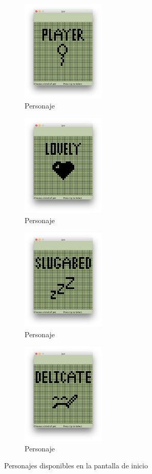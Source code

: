 \documentclass[12pt]{amsart}
\begin{document}
\begin{figure}
	\begin{subfigure}[b]{4cm}
		\centering
		\includegraphics[width=4cm]{images/Player.jpg}
		\caption{Personaje }
		\label{player}
	\end{subfigure}
	\begin{subfigure}[b]{4cm}
		\centering
		\includegraphics[width=4cm]{images/Lovely.jpg}
		\caption{Personaje }
		\label{lovely}
	\end{subfigure}

	\begin{subfigure}[b]{4cm}
		\centering
		\includegraphics[width=4.0cm]{images/Slugabed.jpg}
		\caption{Personaje }
		\label{slugabed}
	\end{subfigure}
	\begin{subfigure}[b]{4cm}
		\centering
		\includegraphics[width=4cm]{images/Delicate.jpg}
		\caption{Personaje }
		\label{delicate}
	\end{subfigure}
		\caption{Personajes disponibles en la pantalla de inicio}
		\label{personajes}
\end{figure}
\end{document}
